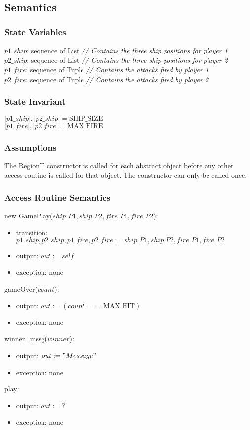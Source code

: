 \documentclass[12pt]{article}
\begin{document}
\subsection* {Semantics}

\subsubsection* {State Variables}

$\mathit{p1\_ship}$: sequence of List {\it // Contains the three ship positions for player 1}\\
$\mathit{p2\_ship}$: sequence of List {\it // Contains the three ship positions for player 2}\\
$\mathit{p1\_fire}$: sequence of Tuple {\it // Contains the attacks fired by player 1}\\
$\mathit{p2\_fire}$: sequence of Tuple {\it // Contains the attacks fired by player 2}

\subsubsection* {State Invariant}

$|p1\_ship| , |p2\_ship| = \mbox{SHIP\_SIZE}$\\
\noindent
$|p1\_fire| , |p2\_fire| = \mbox{MAX\_FIRE}$

\subsubsection* {Assumptions}
The RegionT constructor is called for each abstract object before any other access routine is called for that
object.  The constructor can only be called once.

\subsubsection* {Access Routine Semantics}

\noindent new GamePlay($ship\_P1, ship\_P2, fire\_P1, fire\_P2$):
\begin{itemize}
\item transition: $\mathit{p1\_ship}, \mathit{p2\_ship}, \mathit{ p1\_fire},  \mathit{ p2\_fire} := ship\_P1, ship\_P2, fire\_P1, fire\_P2$
\item output: $out := \mathit{self}$
\item exception: none
\end{itemize}

\noindent gameOver($count$):
\begin{itemize}
\item output: $\mathit{out} := (count == \mbox{MAX\_HIT})$
\item exception: none
\end{itemize}

\noindent winner\_mssg($winner$):
\begin{itemize}
\item output: $\mathit{out} := "Message"$
\item exception: none
\end{itemize}

\noindent play:
\begin{itemize}
\item output: $\mathit{out} := ?$
\item exception: none
\end{itemize}
\end{document}
